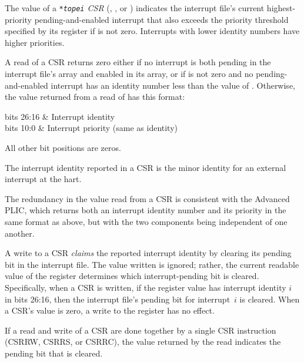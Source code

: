 The value of a \emph{\texttt{*topei} CSR} (, , or
) indicates the interrupt file's current highest-priority
pending-and-enabled interrupt that also exceeds the priority threshold
specified by its  register if  is not
zero.
Interrupts with lower identity numbers have higher priorities.

A read of a  CSR returns zero either if no interrupt
is both pending in the interrupt file's  array and enabled
in its  array, or if  is not zero and no
pending-and-enabled interrupt has an identity number less than the
value of .
Otherwise, the value returned from a read of  has this
format:
\begin{displayLinesTable}[l@{\quad}l]
bits 26:16 & Interrupt identity \\
bits 10:0  & Interrupt priority (same as identity) \\
\end{displayLinesTable}
All other bit positions are zeros.

The interrupt identity reported in a  CSR is the minor
identity for an external interrupt at the hart.

\begin{commentary}
The redundancy in the value read from a  CSR is consistent
with the Advanced PLIC, which returns both an interrupt identity
number and its priority in the same format as above, but with the two
components being independent of one another.
\end{commentary}

A write to a  CSR \emph{claims} the reported interrupt
identity by clearing its pending bit in the interrupt file.
The value written is ignored;
rather, the current readable value of the register determines which
interrupt-pending bit is cleared.
Specifically, when a  CSR is written, if the register value
has interrupt identity $i$ in bits 26:16, then the interrupt file's
pending bit for interrupt~$i$ is cleared.
When a  CSR's value is zero, a write to the register has no
effect.

If a read and write of a  CSR are done together by a single
CSR instruction (CSRRW, CSRRS, or CSRRC), the value returned by the
read indicates the pending bit that is cleared.

